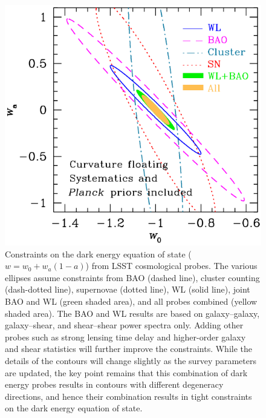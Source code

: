 \begin{figure}
\includegraphics[width=1.0\hsize,clip]{cswb}
\caption{
Constraints on the dark energy equation of state ($w = w_0 +
w_a(1-a)$) from LSST cosmological probes.  The various ellipses assume
constraints from BAO (dashed line), cluster counting (dash-dotted line),
supernovae (dotted line), WL (solid line), joint BAO and WL
(green shaded area), and all probes combined (yellow shaded area).
The BAO and WL results are based on galaxy--galaxy, galaxy--shear,
and shear--shear power spectra only.
Adding other probes such as strong lensing time delay
and higher-order galaxy and shear statistics will further improve
the constraints.  While the details of the contours will change
slightly as the survey parameters are updated,
the key point remains that
this combination of dark energy probes results in contours with different degeneracy directions, and
hence their combination results in tight constraints on the dark energy equation of state. }
\label{Fig:DEellipses}
\end{figure}





